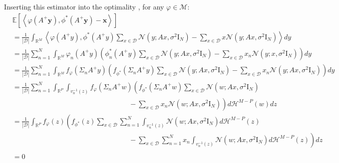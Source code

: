 \documentclass[a4paper,10pt]{article}
\theoremstyle{definition} %
\theoremstyle{definition} %
\theoremstyle{definition} %
\theoremstyle{definition} %
\newcommand{\R}{\mathbb{R}}
\newcommand{\E}[1]{\mathbb{E} \left[ {#1} \right] }
\newcommand{\Normal}[1]{\mathcal{N}\left( {#1} \right)}
\newcommand{\Id}{\mathrm{I}}
\newcommand{\inner}[1]{\left\langle #1 \right\rangle}
\newcommand{\M}{\mathcal{M}}
\newcommand{\x}{\boldsymbol{x}}
\newcommand{\y}{\boldsymbol{y}}
\newcommand{\0}{\boldsymbol{0}}
\renewcommand{\H}{\mathcal{H}}
\newcommand{\D}{\mathcal{D}}
\renewcommand{\det}[1]{\mathrm{det}\left( #1 \right)}
\begin{document}
Inserting this estimator into the optimality , for any $\varphi \in \M$:
\begin{align*}
    &\E{\inner{\varphi(A^+ \y), \phi^*(A^+  \y) - \x}}  \\
    &=  \frac{1}{|\D|} \int_{\R^M} \inner{\varphi(A^+  y), \phi^*(A^+  y) \sum_{x \in \D} \Normal{y; A x, \sigma^2 \Id_N} - \sum_{x \in \D} x \Normal{y; A x, \sigma^2 \Id_N}} dy \\
    &=  \frac{1}{|\D|} \sum_{n = 1}^{N} \int_{\R^M} \varphi_n (A^+  y) \left( \phi^*_n(A^+  y) \sum_{x \in \D} \Normal{y; A x, \sigma^2 \Id_N} - \sum_{x \in \D} x_n \Normal{y; x, \sigma^2 \Id_N} \right) dy \\
    &=  \frac{1}{|\D|} \sum_{n = 1}^{N} \int_{\R^M} f_{\varphi} (\Sigma_n A^+  y) \left( f_{\phi^*}(\Sigma_n A^+  y) \sum_{x \in \D} \Normal{y; A x, \sigma^2 \Id_N} - \sum_{x \in \D} x_n \Normal{y; A x, \sigma^2 \Id_N} \right) dy \\
    &=  \frac{1}{|\D|} \sum_{n = 1}^{N} \int_{\R^P} \int_{v_n^{-1}(z)} f_{\varphi} (\Sigma_n A^+ w) \left( f_{\phi^*}(\Sigma_n A^+ w) \sum_{x \in \D} \Normal{w; A x, \sigma^2 \Id_N} \right. 
    \\& \left. \hspace{7cm} -\sum_{x \in \D} x_n \Normal{w; A x, \sigma^2 \Id_N} \right) d\H^{M - P}(w) dz \\
    &=  \frac{1}{|\D|}  \int_{\R^P} f_{\varphi}(z) \left(  f_{\phi^*}(z) \sum_{x \in \D} \sum_{n = 1}^{N} \int_{v_n^{-1}(z)} \Normal{w; A x, \sigma^2 \Id_N} d\H^{M-P}(z) \right. 
    \\& \left. \hspace{7cm} - \sum_{x \in \D} \sum_{n = 1}^{N} x_n \int_{v_n^{-1}(z)} \Normal{w; A x, \sigma^2 \Id_N} d\H^{M-P}(z)\right) dz \\
    \\&= 0 
\end{align*}
\end{document}
